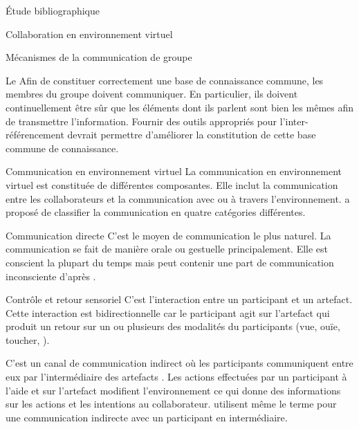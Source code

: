 \documentclass[myfrancais,ngerman,english,french]{mythesis}
\begin{document}
\begin{mychapter}{Étude bibliographique}
\begin{mysection}{Collaboration en environnement virtuel}
\begin{mysubsection}{Mécanismes de la communication de groupe}
\begin{mysubsubsection}{Le \mygrounding}
					Afin de constituer correctement une base de connaissance commune, les membres du groupe doivent communiquer.
					En particulier, ils doivent continuellement être sûr que les éléments dont ils parlent sont bien les mêmes afin de transmettre l'information.
					Fournir des outils appropriés pour l'inter-référencement devrait permettre d'améliorer la constitution de cette base commune de connaissance.
				\end{mysubsubsection}
			\end{mysubsection}
			\begin{mysubsection}{Communication en environnement virtuel}
				La communication en environnement virtuel est constituée de différentes composantes.
				Elle inclut la communication entre les collaborateurs et la communication avec ou à travers l'environnement.
				 a proposé de classifier la communication en quatre catégories différentes.
				\begin{mysubsubsection}{Communication directe}
					C'est le moyen de communication le plus naturel.
					La communication se fait de manière orale ou gestuelle principalement.
					Elle est conscient la plupart du temps mais peut contenir une part de communication inconsciente d'après .
				\end{mysubsubsection}
				\begin{mysubsubsection}{Contrôle et retour sensoriel}
					C'est l'interaction entre un participant et un artefact.
					Cette interaction est bidirectionnelle car le participant agit sur l'artefact qui produit un retour sur un ou plusieurs des modalités du participants (vue, ouïe, toucher, \myetc).
				\end{mysubsubsection}
				\begin{mysubsubsection}{\myFeedthrough}
					C'est un canal de communication indirect où les participants communiquent entre eux par l'intermédiaire des artefacts .
					Les actions effectuées par un participant à l'aide et sur l'artefact modifient l'environnement ce qui donne des informations sur les actions et les intentions au collaborateur.
					 utilisent même le terme \myfeedthrough pour une communication indirecte avec un participant en intermédiaire.
				\end{mysubsubsection}

\end{mysubsection}
\end{mysection}
\end{mychapter}
\end{document}
